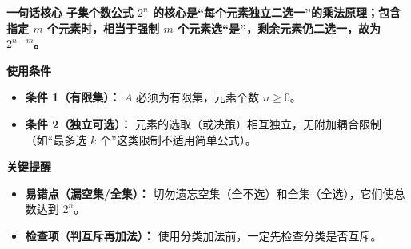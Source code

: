 \begin{summarybox}
	\textbf{\textcolor{CSummary}{一句话核心}}
	\textbf{子集个数公式 $2^n$ 的核心是“每个元素独立二选一”的乘法原理；包含指定 $m$ 个元素时，相当于强制 $m$ 个元素选“是”，剩余元素仍二选一，故为 $2^{n-m}$。}

	\medskip
	\textbf{\textcolor{CSummary}{使用条件}}
	\begin{itemize}[leftmargin=*, itemsep=0.5em, topsep=0.4em]
		\item \textbf{条件 1（有限集）：} $A$ 必须为有限集，元素个数 $n \ge 0$。
		\item \textbf{条件 2（独立可选）：} 元素的选取（或决策）相互独立，无附加耦合限制（如“最多选 $k$ 个”这类限制不适用简单公式）。
	\end{itemize}

	\medskip
	\textbf{\textcolor{CSummary}{关键提醒}}
	\begin{itemize}[leftmargin=*, itemsep=0.5em, topsep=0.4em]
		\item \textbf{易错点（漏空集/全集）：} 切勿遗忘空集（全不选）和全集（全选），它们使总数达到 $2^n$。
		\item \textbf{检查项（判互斥再加法）：} 使用分类加法前，一定先检查分类是否互斥。
	\end{itemize}
\end{summarybox}
